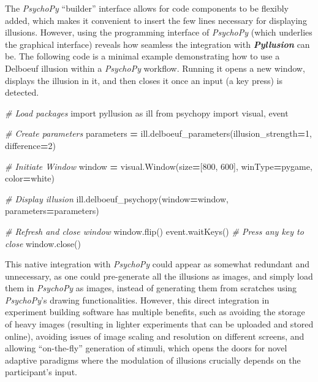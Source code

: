 \documentclass[
  english,
  man,floatsintext]{apa6}
\newenvironment{Shaded}{\begin{snugshade}}{\end{snugshade}}
\newcommand{\CommentTok}[1]{\textcolor[rgb]{0.56,0.35,0.01}{\textit{#1}}}
\newcommand{\DecValTok}[1]{\textcolor[rgb]{0.00,0.00,0.81}{#1}}
\newcommand{\ImportTok}[1]{#1}
\newcommand{\NormalTok}[1]{#1}
\newcommand{\OperatorTok}[1]{\textcolor[rgb]{0.81,0.36,0.00}{\textbf{#1}}}
\newcommand{\StringTok}[1]{\textcolor[rgb]{0.31,0.60,0.02}{#1}}
\begin{document}
The \emph{PsychoPy} ``builder'' interface allows for code components to be flexibly added, which makes it convenient to insert the few lines necessary for displaying illusions. However, using the programming interface of \emph{PsychoPy} (which underlies the graphical interface) reveals how seamless the integration with \textbf{\emph{Pyllusion}} can be. The following code is a minimal example demonstrating how to use a Delboeuf illusion within a \emph{PsychoPy} workflow. Running it opens a new window, displays the illusion in it, and then closes it once an input (a key press) is detected.

\begin{Shaded}
\begin{Highlighting}[]
\CommentTok{\# Load packages}
\ImportTok{import}\NormalTok{ pyllusion }\ImportTok{as}\NormalTok{ ill}
\ImportTok{from}\NormalTok{ psychopy }\ImportTok{import}\NormalTok{ visual, event}

\CommentTok{\# Create parameters}
\NormalTok{parameters }\OperatorTok{=}\NormalTok{ ill.delboeuf\_parameters(illusion\_strength}\OperatorTok{=}\DecValTok{1}\NormalTok{, difference}\OperatorTok{=}\DecValTok{2}\NormalTok{)}

\CommentTok{\# Initiate Window}
\NormalTok{window }\OperatorTok{=}\NormalTok{ visual.Window(size}\OperatorTok{=}\NormalTok{[}\DecValTok{800}\NormalTok{, }\DecValTok{600}\NormalTok{], winType}\OperatorTok{=}\StringTok{\textquotesingle{}pygame\textquotesingle{}}\NormalTok{, color}\OperatorTok{=}\StringTok{\textquotesingle{}white\textquotesingle{}}\NormalTok{)}

\CommentTok{\# Display illusion}
\NormalTok{ill.delboeuf\_psychopy(window}\OperatorTok{=}\NormalTok{window, parameters}\OperatorTok{=}\NormalTok{parameters)}

\CommentTok{\# Refresh and close window}
\NormalTok{window.flip()}
\NormalTok{event.waitKeys()  }\CommentTok{\# Press any key to close}
\NormalTok{window.close()}
\end{Highlighting}
\end{Shaded}

This native integration with \emph{PsychoPy} could appear as somewhat redundant and unnecessary, as one could pre-generate all the illusions as images, and simply load them in \emph{PsychoPy} as images, instead of generating them from scratches using \emph{PsychoPy}'s drawing functionalities. However, this direct integration in experiment building software has multiple benefits, such as avoiding the storage of heavy images (resulting in lighter experiments that can be uploaded and stored online), avoiding issues of image scaling and resolution on different screens, and allowing ``on-the-fly'' generation of stimuli, which opens the doors for novel adaptive paradigms where the modulation of illusions crucially depends on the participant's input.
\end{document}
